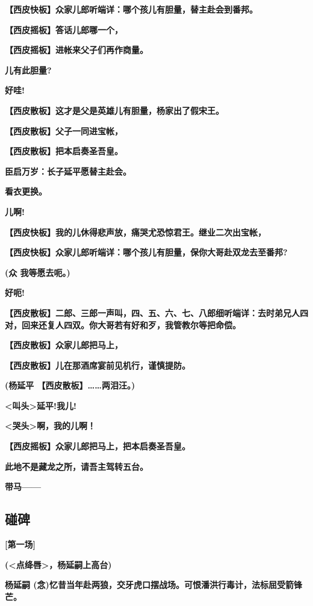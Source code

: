 \textbf{【西皮快板】众家儿郎听端详：哪个孩儿有胆量，替主赴会到番邦。}

\textbf{【西皮摇板】答话儿郎哪一个，}

\textbf{【西皮摇板】进帐来父子们再作商量。}

\textbf{儿有此胆量?}

\textbf{好哇!}

\textbf{【西皮散板】这才是父是英雄儿有胆量，杨家出了假宋王。}

\textbf{【西皮散板】父子一同进宝帐，}

\textbf{【西皮散板】把本启奏圣吾皇。}

\textbf{臣启万岁：长子延平愿替主赴会。}

\textbf{看衣更换。}

\textbf{儿啊!}

\textbf{【西皮快板】我的儿休得悲声放，痛哭尤恐惊君王。继业二次出宝帐，}

\textbf{【西皮快板】众家儿郎听端详：哪个孩儿有胆量，保你大哥赴双龙去至番邦?}

\textbf{(众 我等愿去呃。)}

\textbf{好呃!}

\textbf{【西皮散板】二郎、三郎一声叫，四、五、六、七、八郎细听端详：去时弟兄人四对，回来还复人四双。你大哥若有好和歹，我管教尔等把命偿。}

\textbf{【西皮散板】众家儿郎把马上，}

\textbf{【西皮散板】儿在那酒席宴前见机行，谨慎提防。}

\textbf{(杨延平 【西皮散板】\ldots{}\ldots{}两泪汪。)}

\textbf{\textless{}叫头\textgreater{}延平!我儿!}

\textbf{\textless{}哭头\textgreater{}啊，我的儿啊！}

\textbf{【西皮摇板】众家儿郎把马上，把本启奏圣吾皇。}

\textbf{此地不是藏龙之所，请吾主驾转五台。}

\textbf{带马------}

\newpage
\hypertarget{ux78b0ux7891}{%
\subsection{碰碑}\label{ux78b0ux7891}}

\textbf{{[}第一场{]}}

\textbf{(\textless{}点绛唇\textgreater{}，杨延嗣上高台)}

\textbf{杨延嗣
(念)忆昔当年赴两狼，交牙虎口摆战场。可恨潘洪行毒计，法标屈受箭锋芒。}

